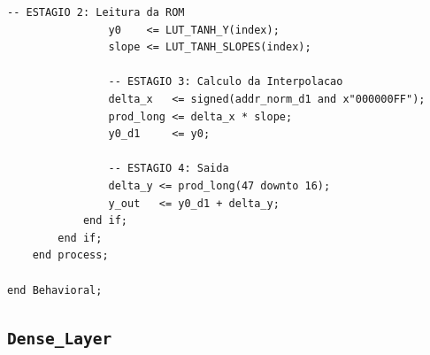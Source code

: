 \documentclass[a4paper,12pt]{article}
\begin{document}
\begin{lstlisting}[style=vhdlstyle,
    caption={C\'odigo VHDL do \texttt{LUT\_Tanh}.},
    label={lst:lut_tanh}]
                -- ESTAGIO 2: Leitura da ROM
                y0    <= LUT_TANH_Y(index);
                slope <= LUT_TANH_SLOPES(index);

                -- ESTAGIO 3: Calculo da Interpolacao
                delta_x   <= signed(addr_norm_d1 and x"000000FF");
                prod_long <= delta_x * slope;
                y0_d1     <= y0;

                -- ESTAGIO 4: Saida
                delta_y <= prod_long(47 downto 16);
                y_out   <= y0_d1 + delta_y;
            end if;
        end if;
    end process;

end Behavioral;
\end{lstlisting}

\subsection{\texttt{Dense\_Layer}}
\end{document}
